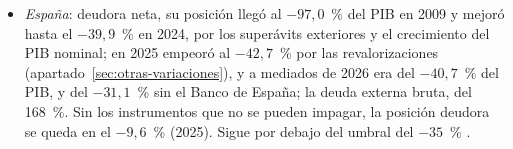 \documentclass[11pt]{article}
\begin{document}
\begin{itemize}
\begin{itemize}
  \item \emph{sectores}: un pasivo del banco central frente al Eurosistema no tiene el riesgo de refinanciación de una deuda bancaria a corto plazo.
  \end{itemize}
  Se discute qué medida predice mejor las crisis: los pasivos \emph{brutos}, que miden la exposición\nocite{Shin2012}, o los \emph{netos}, sobre todo los de deuda\nocite{CataoMilesiFerretti2014}.
\item \emph{España}: deudora neta, su posición llegó al $-97{,}0$~\% del PIB en 2009 y mejoró hasta el $-39{,}9$~\% en 2024, por los superávits exteriores y el crecimiento del PIB nominal; en 2025 empeoró al $-42{,}7$~\% por las revalorizaciones (apartado~\ref{sec:otras-variaciones}), y a mediados de 2026 era del $-40{,}7$~\% del PIB, y del $-31{,}1$~\% sin el Banco de España; la deuda externa bruta, del 168~\%\nocite{BdE2026PII2T}. Sin los instrumentos que no se pueden impagar, la posición deudora se queda en el $-9{,}6$~\% (2025)\nocite{Eurostat2026MIPExterior}. Sigue por debajo del umbral del $-35$~\% .
\end{itemize}
\end{document}
